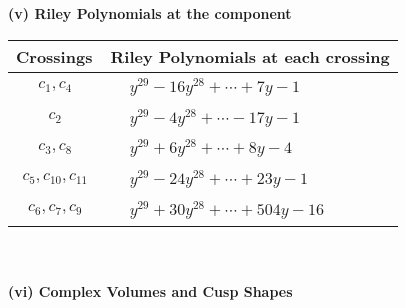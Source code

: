 \documentclass[1p]{elsarticle_modified}
\theoremstyle{definition}
\begin{document}
\newpage\renewcommand{\arraystretch}{1}
\flushleft \textbf{(v) Riley Polynomials at the component}\newline \\
\begin{tabular}{m{50pt}|m{274pt}}
Crossings & \hspace{64pt}Riley Polynomials at each crossing \\
\hline $$\begin{aligned}c_{1},c_{4}\end{aligned}$$&$\begin{aligned}
&y^{29}-16 y^{28}+\cdots+7 y-1
\end{aligned}$\\
\hline $$\begin{aligned}c_{2}\end{aligned}$$&$\begin{aligned}
&y^{29}-4 y^{28}+\cdots-17 y-1
\end{aligned}$\\
\hline $$\begin{aligned}c_{3},c_{8}\end{aligned}$$&$\begin{aligned}
&y^{29}+6 y^{28}+\cdots+8 y-4
\end{aligned}$\\
\hline $$\begin{aligned}c_{5},c_{10},c_{11}\end{aligned}$$&$\begin{aligned}
&y^{29}-24 y^{28}+\cdots+23 y-1
\end{aligned}$\\
\hline $$\begin{aligned}c_{6},c_{7},c_{9}\end{aligned}$$&$\begin{aligned}
&y^{29}+30 y^{28}+\cdots+504 y-16
\end{aligned}$\\
\hline
\end{tabular}\\~\\
\newpage\flushleft \textbf{(vi) Complex Volumes and Cusp Shapes}
\end{document}
